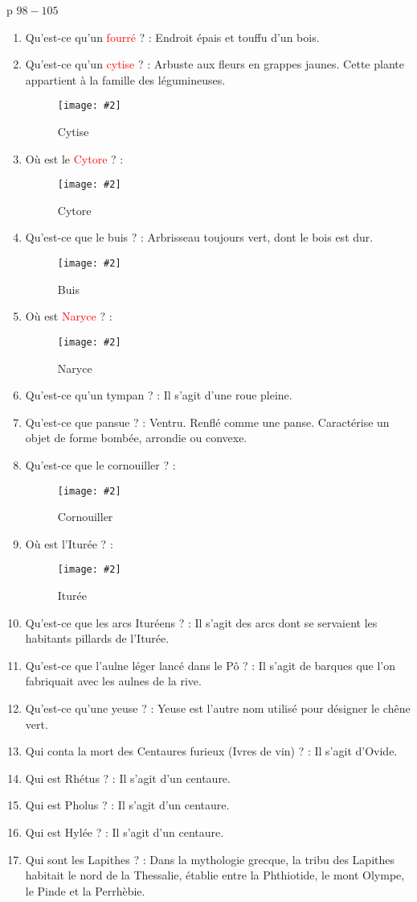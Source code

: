 \documentclass[a4paper, 11pt, hidelinks]{article}
\newcommand{\img}[4]{\begin{figure}[!ht]
    \centering
    \texttt{[image: \#2]}
    \caption{#3}
    \label{#4}
    \end{figure} }
\begin{document}
p $98 - 105$



\begin{enumerate}
      \item Qu'est-ce qu'un \textcolor{red}{fourré} ? : Endroit épais et touffu d'un bois.
      \item Qu'est-ce qu'un \textcolor{red}{cytise} ? : Arbuste aux fleurs en grappes jaunes. Cette plante appartient à la famille des légumineuses.
            \img{0.5}{Cytise.jpg}{Cytise}{95}
      \item Où est le \textcolor{red}{Cytore} ? :
            \img{0.3}{Cytore.png}{Cytore}{96}
      \item Qu'est-ce que le buis ? : Arbrisseau toujours vert, dont le bois est dur.
            \img{0.5}{Buis.jpg}{Buis}{97}
            \newpage
      \item Où est \textcolor{red}{Naryce} ? : 
            \img{0.3}{Naryce.png}{Naryce}{98}
      \item Qu'est-ce qu'un tympan ? : Il s'agit d'une roue pleine.
      \item Qu'est-ce que pansue ? : Ventru. Renflé comme une panse. Caractérise un objet de forme bombée, arrondie ou convexe.
      \item Qu'est-ce que le cornouiller ? :
            \img{0.5}{Cornouiller.jpg}{Cornouiller}{99}
      \item Où est l'Iturée ? :
            \img{0.3}{Ituree.png}{Iturée}{100}
      \item Qu'est-ce que les arcs Ituréens ? : Il s'agit des arcs dont se servaient les habitants pillards de l'Iturée.
      \item Qu'est-ce que l'aulne léger lancé dans le Pô ? : Il s'agit de barques que l'on fabriquait avec les aulnes de la rive.
      \item Qu'est-ce qu'une yeuse ? : Yeuse est l'autre nom utilisé pour désigner le chêne vert.
      \item Qui conta la mort des Centaures furieux (Ivres de vin) ? : Il s'agit d'Ovide.
      \item Qui est Rhétus ? : Il s'agit d'un centaure.
      \item Qui est Pholus ? : Il s'agit d'un centaure.
      \item Qui est Hylée ? : Il s'agit d'un centaure.
      \item Qui sont les Lapithes ? : Dans la mythologie grecque, la tribu des Lapithes habitait le nord de la Thessalie, établie entre la Phthiotide, le mont Olympe, le Pinde et la Perrhèbie.

\end{enumerate}
\end{document}
